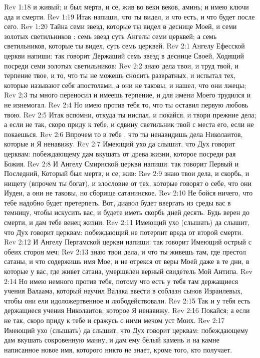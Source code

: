 \vs Rev 1:18 и живый; и был мертв, и се, жив во веки веков, аминь; и имею ключи ада и смерти.
\vs Rev 1:19 Итак напиши, что ты видел, и что есть, и что будет после сего.
\vs Rev 1:20 Тайна семи звезд, которые ты видел в деснице Моей, и семи золотых светильников : семь звезд суть Ангелы семи церквей; а семь светильников, которые ты видел, суть семь церквей.
\vs Rev 2:1 Ангелу Ефесской церкви напиши: так говорит Держащий семь звезд в деснице Своей, Ходящий посреди семи золотых светильников:
\vs Rev 2:2 знаю дела твои, и труд твой, и терпение твое, и то, что ты не можешь сносить развратных, и испытал тех, которые называют себя апостолами, а они не таковы, и нашел, что они лжецы;
\vs Rev 2:3 ты много переносил и имеешь терпение, и для имени Моего трудился и не изнемогал.
\vs Rev 2:4 Но имею против тебя то, что ты оставил первую любовь твою.
\vs Rev 2:5 Итак вспомни, откуда ты ниспал, и покайся, и твори прежние дела; а если не так, скоро приду к тебе, и сдвину светильник твой с места его, если не покаешься.
\vs Rev 2:6 Впрочем то в тебе , что ты ненавидишь дела Николаитов, которые и Я ненавижу.
\vs Rev 2:7 Имеющий ухо да слышит, что Дух говорит церквам: побеждающему дам вкушать от древа жизни, которое посреди рая Божия.
\rsbpar\vs Rev 2:8 И Ангелу Смирнской церкви напиши: так говорит Первый и Последний, Который был мертв, и се, жив:
\vs Rev 2:9 знаю твои дела, и скорбь, и нищету (впрочем ты богат), и злословие от тех, которые говорят о себе, что они Иудеи, а они не таковы, но сборище сатанинское.
\vs Rev 2:10 Не бойся ничего, что тебе надобно будет претерпеть. Вот, диавол будет ввергать из среды вас в темницу, чтобы искусить вас, и будете иметь скорбь дней десять. Будь верен до смерти, и дам тебе венец жизни.
\vs Rev 2:11 Имеющий ухо (слышать) да слышит, что Дух говорит церквам: побеждающий не потерпит вреда от второй смерти.
\rsbpar\vs Rev 2:12 И Ангелу Пергамской церкви напиши: так говорит Имеющий острый с обеих сторон меч:
\vs Rev 2:13 знаю твои дела, и что ты живешь там, где престол сатаны, и что содержишь имя Мое, и не отрекся от веры Моей даже в те дни, в которые у вас, где живет сатана, умерщвлен верный свидетель Мой Антипа.
\vs Rev 2:14 Но имею немного против тебя, потому что есть у тебя там держащиеся учения Валаама, который научил Валака ввести в соблазн сынов Израилевых, чтобы они ели идоложертвенное и любодействовали.
\vs Rev 2:15 Так и у тебя есть держащиеся учения Николаитов, которое Я ненавижу.
\vs Rev 2:16 Покайся; а если не так, скоро приду к тебе и сражусь с ними мечом уст Моих.
\vs Rev 2:17 Имеющий ухо (слышать) да слышит, что Дух говорит церквам: побеждающему дам вкушать сокровенную манну, и дам ему белый камень и на камне написанное новое имя, которого никто не знает, кроме того, кто получает.
